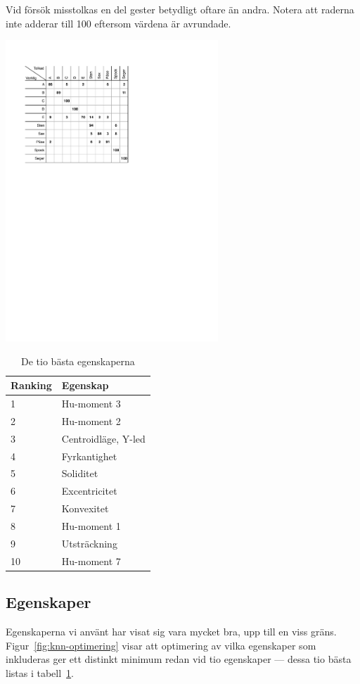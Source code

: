 \documentclass[../rapport_MVEX01-11-05]{subfiles}
\begin{document}
\begin{table}[tbp]
	  \centering
		\caption{Vid försök misstolkas en del gester betydligt oftare än
		andra. Notera att raderna inte adderar till 100 eftersom värdena är
		avrundade.}
		\label{tab:tolkningsmatris}
    \includegraphics[trim=2cm 16cm 8cm 2.5cm,clip=true,width=8cm]{bilder/tolkningsmatris.pdf}
\end{table}

\begin{table}[tb]
	\centering
	\caption{De tio bästa egenskaperna}
	
	\label{tab:bestfeats}
	\begin{tabular}{ll}
		\toprule
		Ranking & Egenskap \\
		\midrule
		1 & Hu-moment 3 \\
		2 & Hu-moment 2 \\
		3 & Centroidläge, Y-led \\
		4 & Fyrkantighet \\
		5 & Soliditet \\
		6 & Excentricitet \\
		7 & Konvexitet \\
		8 & Hu-moment 1 \\
		9 & Utsträckning \\
		10 & Hu-moment 7 \\
		\bottomrule
	\end{tabular}
\end{table}

\subsection{Egenskaper}\label{sec:resultat_features}

Egenskaperna vi använt har visat sig vara mycket bra, upp till en viss gräns.
Figur~\ref{fig:knn-optimering} visar att optimering av vilka egenskaper som
inkluderas ger ett distinkt minimum redan vid tio egenskaper --- dessa tio
bästa listas i tabell~\ref{tab:bestfeats}.
\end{document}
